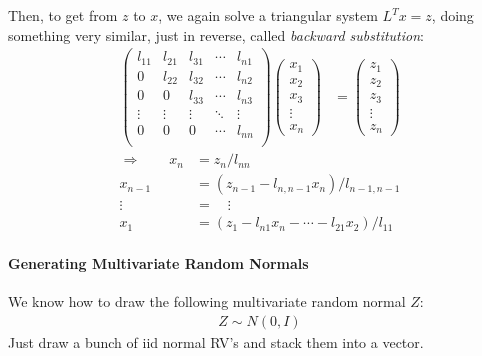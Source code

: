 \documentclass[12pt]{article}
\theoremstyle{plain}
\theoremstyle{definition}
\theoremstyle{remark}
\begin{document}
Then, to get from $z$ to $x$, we again solve a triangular system $L^Tx =
z$, doing something very similar, just in reverse, called \emph{backward
substitution}:
\begin{align*}
  \begin{pmatrix}
    l_{11} & l_{21}  & l_{31} & \cdots & l_{n1}  \\
    0 & l_{22} &  l_{32} & \cdots & l_{n2}\\
    0 & 0 & l_{33}& \cdots & l_{n3}\\
    \vdots & \vdots & \vdots & \ddots & \vdots\\
    0 & 0 & 0 &\cdots & l_{nn}\\
  \end{pmatrix}
  \begin{pmatrix}
    x_1 \\ x_2 \\ x_3 \\ \vdots \\ x_n
  \end{pmatrix}
  &=
  \begin{pmatrix}
    z_1 \\ z_2 \\ z_3 \\ \vdots \\ z_n
  \end{pmatrix}
\end{align*}
\begin{align*}
  \Rightarrow \qquad
  x_n &= z_n/l_{nn} \\
  x_{n-1} &= (z_{n-1} - l_{n,n-1}x_n)/l_{n-1,n-1} \\
  \vdots \; &= \quad \vdots\\
  x_1 &= (z_1 - l_{n1}x_n - \cdots - l_{21}x_{2})/l_{11}
\end{align*}

\paragraph{Generating Multivariate Random Normals}
We know how to draw the following multivariate random normal $Z$:
\begin{align*}
  Z \sim N(0,I)
\end{align*}
Just draw a bunch of iid normal RV's and stack them into a vector.
\end{document}
